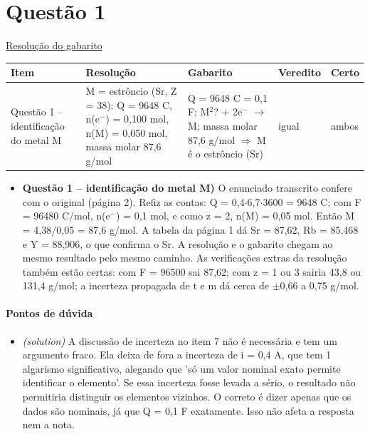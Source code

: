 \documentclass{article}%
\begin{document}
\section*{Questão 1}%
\href{https://poliedroresolve.sistemapoliedro.com.br/vestibulares/ime/2026/ime-2-fase-dia-3-25-10-2025-2-fase-dia-3/dissertativa-1-quimica-2-fase-dia-3-ime-2026}{Resolução do gabarito}\par\smallskip%
\begin{longtable}{@{}p{} p{} p{} p{} p{}@{}}\toprule Item & Resolução & Gabarito & Veredito & Certo \\ \midrule
Questão 1 -- identificação do metal M & M = estrôncio (Sr, Z = 38): Q = 9648 C, n(e$^{-}$) = 0,100 mol, n(M) = 0,050 mol, massa molar 87,6 g/mol & Q = 9648 C = 0,1 F; M$^2$? + 2e$^{-}$ $\to$ M; massa molar 87,6 g/mol $\Rightarrow$ M é o estrôncio (Sr) & igual & ambos \\
\bottomrule\end{longtable}%
\begin{itemize}%
\item%
\textbf{Questão 1 -- identificação do metal M)} O enunciado transcrito confere com o original (página 2). Refiz as contas: Q = 0,4$\cdot$6,7$\cdot$3600 = 9648 C; com F = 96480 C/mol, n(e$^{-}$) = 0,1 mol, e como z = 2, n(M) = 0,05 mol. Então M = 4,38/0,05 = 87,6 g/mol. A tabela da página 1 dá Sr = 87,62, Rb = 85,468 e Y = 88,906, o que confirma o Sr. A resolução e o gabarito chegam ao mesmo resultado pelo mesmo caminho. As verificações extras da resolução também estão certas: com F = 96500 sai 87,62; com z = 1 ou 3 sairia 43,8 ou 131,4 g/mol; a incerteza propagada de t e m dá cerca de $\pm$0,66 a 0,75 g/mol.%
\end{itemize}%
\paragraph{Pontos de dúvida}%
\begin{itemize}%
\item%
\textit{(solution)} A discussão de incerteza no item 7 não é necessária e tem um argumento fraco. Ela deixa de fora a incerteza de i = 0,4 A, que tem 1 algarismo significativo, alegando que 'só um valor nominal exato permite identificar o elemento'. Se essa incerteza fosse levada a sério, o resultado não permitiria distinguir os elementos vizinhos. O correto é dizer apenas que os dados são nominais, já que Q = 0,1 F exatamente. Isso não afeta a resposta nem a nota.%
\end{itemize}%
\end{document}
